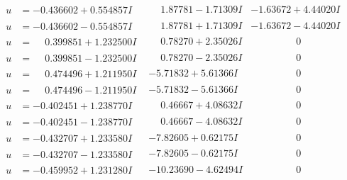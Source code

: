 \documentclass[1p]{elsarticle_modified}
\theoremstyle{definition}
\begin{document}
$$\begin{array}{c|c|c}
\begin{aligned}
u &= -0.436602 + 0.554857 I\end{aligned}
 & \phantom{-}1.87781 - 1.71309 I & -1.63672 + 4.44020 I \\ \hline\begin{aligned}
u &= -0.436602 - 0.554857 I\end{aligned}
 & \phantom{-}1.87781 + 1.71309 I & -1.63672 - 4.44020 I \\ \hline\begin{aligned}
u &= \phantom{-}0.399851 + 1.232500 I\end{aligned}
 & \phantom{-}0.78270 + 2.35026 I & \phantom{-0.000000 } 0 \\ \hline\begin{aligned}
u &= \phantom{-}0.399851 - 1.232500 I\end{aligned}
 & \phantom{-}0.78270 - 2.35026 I & \phantom{-0.000000 } 0 \\ \hline\begin{aligned}
u &= \phantom{-}0.474496 + 1.211950 I\end{aligned}
 & -5.71832 + 5.61366 I & \phantom{-0.000000 } 0 \\ \hline\begin{aligned}
u &= \phantom{-}0.474496 - 1.211950 I\end{aligned}
 & -5.71832 - 5.61366 I & \phantom{-0.000000 } 0 \\ \hline\begin{aligned}
u &= -0.402451 + 1.238770 I\end{aligned}
 & \phantom{-}0.46667 + 4.08632 I & \phantom{-0.000000 } 0 \\ \hline\begin{aligned}
u &= -0.402451 - 1.238770 I\end{aligned}
 & \phantom{-}0.46667 - 4.08632 I & \phantom{-0.000000 } 0 \\ \hline\begin{aligned}
u &= -0.432707 + 1.233580 I\end{aligned}
 & -7.82605 + 0.62175 I & \phantom{-0.000000 } 0 \\ \hline\begin{aligned}
u &= -0.432707 - 1.233580 I\end{aligned}
 & -7.82605 - 0.62175 I & \phantom{-0.000000 } 0 \\ \hline\begin{aligned}
u &= -0.459952 + 1.231280 I\end{aligned}
 & -10.23690 - 4.62494 I & \phantom{-0.000000 } 0 \\ \hline\begin{aligned}

\end{aligned}
\end{array}$$
\end{document}
